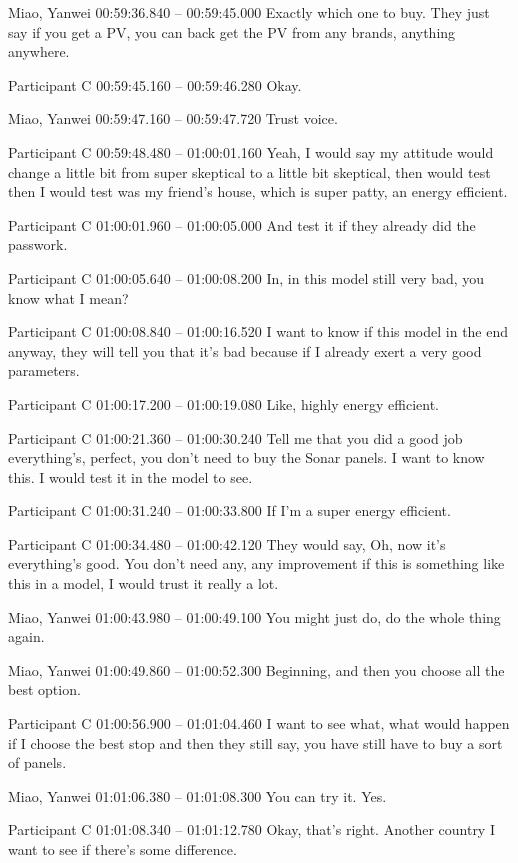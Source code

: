 {Miao, Yanwei 00:59:36.840 -- 00:59:45.000
Exactly which one to buy. They just say if you get a PV, you can back get the PV from any brands, anything anywhere.

Participant C 00:59:45.160 -- 00:59:46.280
Okay.

Miao, Yanwei 00:59:47.160 -- 00:59:47.720
Trust voice.

Participant C 00:59:48.480 -- 01:00:01.160
Yeah, I would say my attitude would change a little bit from super skeptical to a little bit skeptical, then would test then I would test was my friend's house, which is super patty, an energy efficient.

Participant C 01:00:01.960 -- 01:00:05.000
And test it if they already did the passwork.

Participant C 01:00:05.640 -- 01:00:08.200
In, in this model still very bad, you know what I mean?

Participant C 01:00:08.840 -- 01:00:16.520
I want to know if this model in the end anyway, they will tell you that it's bad because if I already exert a very good parameters.

Participant C 01:00:17.200 -- 01:00:19.080
Like, highly energy efficient.

Participant C 01:00:21.360 -- 01:00:30.240
Tell me that you did a good job everything's, perfect, you don't need to buy the Sonar panels. I want to know this. I would test it in the model to see.

Participant C 01:00:31.240 -- 01:00:33.800
If I'm a super energy efficient.

Participant C 01:00:34.480 -- 01:00:42.120
They would say, Oh, now it's everything's good. You don't need any, any improvement if this is something like this in a model, I would trust it really a lot.

Miao, Yanwei 01:00:43.980 -- 01:00:49.100
You might just do, do the whole thing again.

Miao, Yanwei 01:00:49.860 -- 01:00:52.300
Beginning, and then you choose all the best option.

Participant C 01:00:56.900 -- 01:01:04.460
I want to see what, what would happen if I choose the best stop and then they still say, you have still have to buy a sort of panels.

Miao, Yanwei 01:01:06.380 -- 01:01:08.300
You can try it. Yes.

Participant C 01:01:08.340 -- 01:01:12.780
Okay, that's right. Another country I want to see if there's some difference.

}
